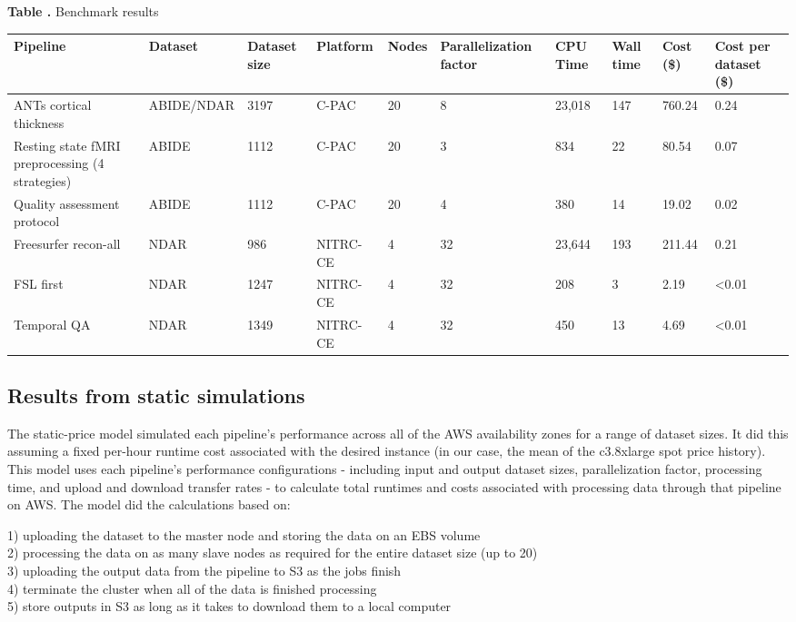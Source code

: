 \documentclass{frontiersSCNS} %
\begin{document}
\begin{table}[!ht]
\textbf{\label{Tab:02} Table .}{ Benchmark results}

\processtable{}
{\begin{tabular}{llllllllll}
        Pipeline & Dataset & Dataset size & Platform & Nodes & Parallelization factor & CPU Time & Wall time & Cost (\$) & Cost per dataset (\$)\\\midrule
        ANTs cortical thickness & ABIDE/NDAR & 3197 & C-PAC & 20 & 8 & 23,018 & 147 & 760.24 & 0.24\\
        Resting state fMRI preprocessing (4 strategies) & ABIDE & 1112 & C-PAC & 20 & 3 & 834 & 22 & 80.54 & 0.07\\
        Quality assessment protocol & ABIDE & 1112 & C-PAC & 20 & 4 & 380 & 14 & 19.02 & 0.02\\
        Freesurfer recon-all & NDAR & 986 & NITRC-CE & 4 & 32 & 23,644 & 193 & 211.44 & 0.21\\
        FSL first & NDAR & 1247 & NITRC-CE & 4 & 32 & 208 & 3 & 2.19 & <0.01 \\
        Temporal QA & NDAR & 1349 & NITRC-CE & 4 & 32 & 450 & 13 & 4.69 & <0.01
\end{tabular}}{}
\end{table}

\subsection{Results from static simulations}


The static-price model simulated each pipeline's performance across all of the AWS availability zones for a range of dataset sizes. It did this assuming a fixed per-hour runtime cost associated with the desired instance (in our case, the mean of the c3.8xlarge spot price history). This model uses each pipeline's performance configurations - including input and output dataset sizes, parallelization factor, processing time, and upload and download transfer rates - to calculate total runtimes and costs associated with processing data through that pipeline on AWS. The model did the calculations based on:

1) uploading the dataset to the master node and storing the data on an EBS volume\\2) processing the data on as many slave nodes as required for the entire dataset size (up to 20)\\3) uploading the output data from the pipeline to S3 as the jobs finish\\4) terminate the cluster when all of the data is finished processing\\5) store outputs in S3 as long as it takes to download them to a local computer
\end{document}
